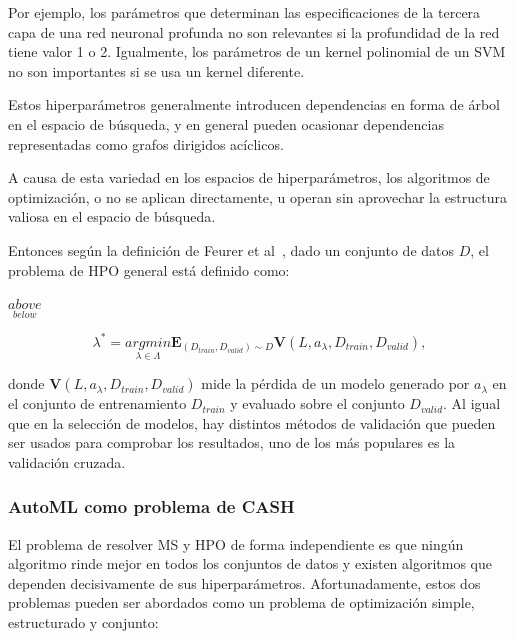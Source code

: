 Por ejemplo, los parámetros que determinan las especificaciones de la tercera capa de una red neuronal profunda no son relevantes si la profundidad de la red tiene valor 1 o 2. Igualmente, los parámetros de un kernel polinomial de un SVM no son importantes si se usa un kernel diferente.

Estos hiperparámetros generalmente introducen dependencias en forma de árbol en el espacio de búsqueda, y en general pueden ocasionar dependencias representadas como grafos dirigidos acíclicos.


A causa de esta variedad en los espacios de hiperparámetros, los algoritmos de optimización, o no se aplican directamente, u operan sin aprovechar la estructura valiosa en el espacio de búsqueda.

Entonces según la definición de Feurer et al~\cite{fuerer2019hyperparameter}, dado un conjunto de datos $D$, el problema de HPO general está definido como:

$\underset{below}{above}$

\begin{equation}
	\lambda^* = \underset{\lambda \in \Lambda}{argmin} \textbf{E}_{(D_{train}, D_{valid}) \sim  D}\textbf{V}(L, a_\lambda, D_{train}, D_{valid}),
\end{equation}

donde $\textbf{V}(L, a_\lambda, D_{train}, D_{valid})$ mide la pérdida de un modelo generado por $a_\lambda$ en el conjunto de entrenamiento $D_{train}$ y evaluado sobre el conjunto $D_{valid}$. Al igual que en la selección de modelos, hay distintos métodos de validación que pueden ser usados para comprobar los resultados, uno de los más populares es la validación cruzada.

\subsubsection{AutoML como problema de CASH} 

El problema de resolver MS y HPO de forma independiente es que ningún algoritmo rinde mejor en todos los conjuntos de datos y existen algoritmos que dependen decisivamente de sus hiperparámetros. Afortunadamente, estos dos problemas pueden ser abordados como un problema de optimización simple, estructurado y conjunto:

